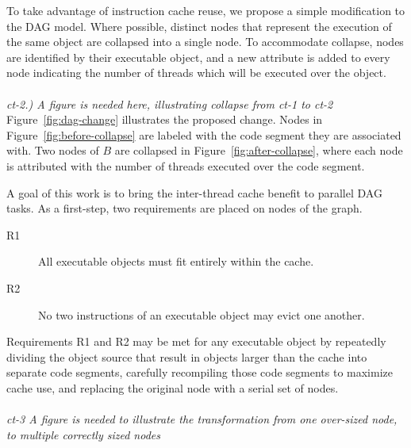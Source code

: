 To take advantage of instruction cache reuse, we propose a simple modification to the DAG
model. Where possible, distinct nodes that represent the execution of
the same object are collapsed into a single node. To accommodate collapse,
nodes are identified by their executable object, and a new attribute is added to every node
indicating the number of threads which will be executed over the object.
\\
\\
\emph{ct-2.) A figure is needed here, illustrating collapse from ct-1 to ct-2}
\\


Figure~\ref{fig:dag-change} illustrates the proposed change. Nodes in
Figure~\ref{fig:before-collapse} are labeled with the code segment
they are associated with. Two nodes of ${B}$ are collapsed in
Figure~\ref{fig:after-collapse}, where each node is attributed with
the number of threads executed over the code segment.

A goal of this work is to bring the inter-thread cache benefit \addcite to parallel DAG tasks. As a first-step, two requirements are placed on nodes of the graph.
\begin{description}
\item[R1] All executable objects must fit entirely within the cache.
\item[R2] No two instructions of an executable object may evict one another.
\end{description}

Requirements R1 and R2 may be met for any executable object by repeatedly dividing
the object source that result in objects larger than the cache into separate code segments, carefully recompiling those code segments to maximize cache use, and replacing the original node with a serial set of nodes.
\\
\\
\emph{ct-3 A figure is needed to illustrate the transformation from one over-sized node, to multiple correctly sized nodes}
\\

